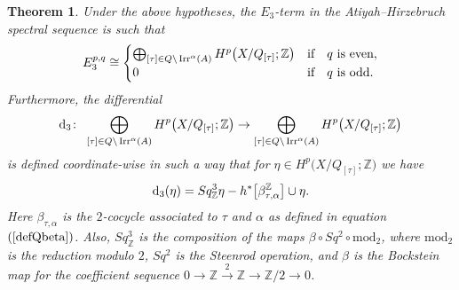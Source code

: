 \documentclass[pdftex]{sigma}
\def\Z{\mathbb{Z}}
\DeclareMathOperator{\Irr}{\textup{Irr}}
\newtheorem{Th}{Theorem}[section]
\theoremstyle{definition}
\numberwithin{equation}{section}
\begin{document}
\begin{Th}
Under the above hypotheses, the $E_{3}$-term in the Atiyah--Hirzebruch spectral sequence is such that
\begin{gather*}
E_{3}^{p,q} \cong
\begin{cases}
\bigoplus_{[\tau]\in Q \backslash \Irr^{\alpha}(A)}H^{p}\big(X/Q_{[\tau]};\Z\big) &\text{if}\quad q
\ \text{is even},
\\
0& \text{if}\quad q\ \text{is odd}.
\end{cases}
\end{gather*}
Furthermore, the differential
\begin{gather*}
{\rm d}_{3}\colon\ \bigoplus_{[\tau]\in Q \backslash \Irr^{\alpha}(A)}H^{p}\big(X/Q_{[\tau]};\Z\big) \to
\bigoplus_{[\tau]\in Q \backslash \Irr^{\alpha}(A)}H^{p}\big(X/Q_{[\tau]};\Z\big)
\end{gather*}
is defined coordinate-wise in such a way that for $\eta\in H^{p}\big(X/Q_{[\tau]};\Z\big)$ we have
\begin{gather*}
{\rm d}_3(\eta) = Sq^3_\Z \eta - h^*\big[\beta_{\tau,\alpha}^{\Z}\big] \cup \eta.
\end{gather*}
Here $\beta_{\tau,\alpha}$ is the $2$-cocycle associated to $\tau$ and $\alpha$ as defined in equation~$(\ref{defQbeta})$. Also, $Sq^3_\Z$ is the composition of the maps $\beta \circ Sq^2 \circ \text{mod}_2$, where $\text{mod}_2$
is the reduction modulo $2$, $Sq^2$ is the Steenrod operation, and $\beta$ is the Bockstein map for the coefficient sequence
$0\to\Z \xrightarrow{2}\Z \to \Z/2\to 0$.
\end{Th}
\end{document}
